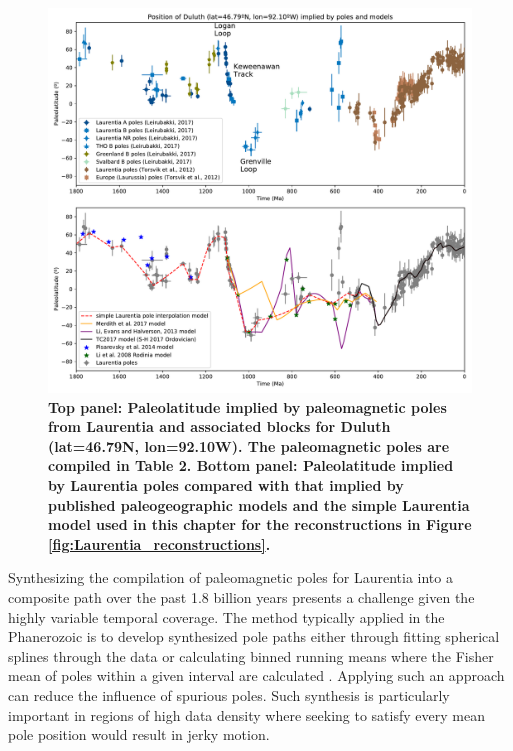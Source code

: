 \documentclass[11pt,letterpaper]{article}
\begin{document}
\begin{figure}
\centering
\includegraphics[width=\textwidth]{../Figures/Laurentia_paleolatitude.pdf}
\caption{\small{\textbf{Top panel: Paleolatitude implied by paleomagnetic poles from Laurentia and associated blocks for Duluth (lat=46.79\textdegree N, lon=92.10\textdegree W). The paleomagnetic poles are compiled in Table 2. Bottom panel: Paleolatitude implied by Laurentia poles compared with that implied by published paleogeographic models and the simple Laurentia model used in this chapter for the reconstructions in Figure \ref{fig:Laurentia_reconstructions}.}}}
\label{fig:Laurentia_paleolatitude}
\end{figure} 

Synthesizing the compilation of paleomagnetic poles for Laurentia into a composite path over the past 1.8 billion years presents a challenge given the highly variable temporal coverage. The method typically applied in the Phanerozoic is to develop synthesized pole paths either through fitting spherical splines through the data or calculating binned running means where the Fisher mean of poles within a given interval are calculated \citep{Torsvik2012a}. Applying such an approach can reduce the influence of spurious poles. Such synthesis is particularly important in regions of high data density where seeking to satisfy every mean pole position would result in jerky motion. 
\end{document}
